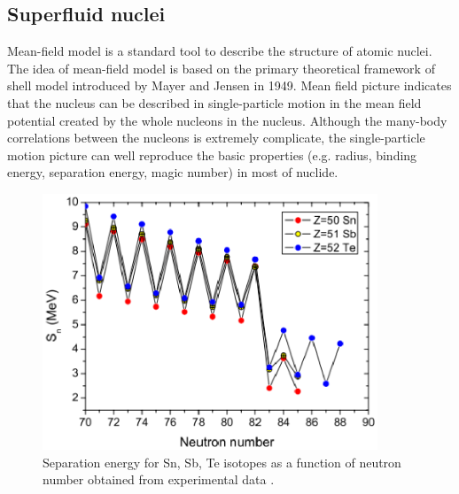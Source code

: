 \documentclass[11pt]{book} %
\begin{document}
\subsection{Superfluid nuclei}

Mean-field model is a standard tool to describe the structure of atomic nuclei. The idea of mean-field model is based on the primary theoretical framework of shell model introduced by Mayer and Jensen in 1949. Mean field picture indicates that the nucleus can be described in single-particle motion in the mean field potential created by the whole nucleons in the nucleus. Although the many-body correlations between the nucleons is extremely complicate, the single-particle motion picture can well reproduce the basic properties (e.g. radius, binding energy, separation energy, magic number) in most of nuclide. %

\begin{figure}[tb]
 \begin{center}
    \includegraphics[width=100mm]{images/S_n.eps}
 \end{center}
  \caption{Separation energy for Sn, Sb, Te isotopes as a function of neutron number obtained from experimental data \cite{KJJ12}.}
  \label{S_n}
\end{figure}
\end{document}
